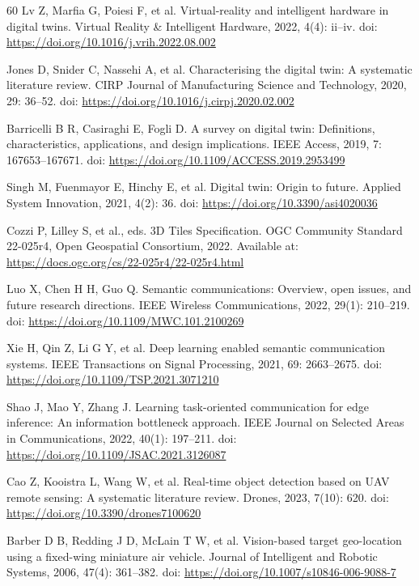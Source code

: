 \documentclass[fleqn]{VRIH2025}
\begin{document}
\begin{thebibliography}{60}
Lv Z, Marfia G, Poiesi F, et al. Virtual-reality and intelligent hardware in digital twins. Virtual Reality \& Intelligent Hardware, 2022, 4(4): ii--iv. doi: \url{https://doi.org/10.1016/j.vrih.2022.08.002}

Jones D, Snider C, Nassehi A, et al. Characterising the digital twin: A systematic literature review. CIRP Journal of Manufacturing Science and Technology, 2020, 29: 36--52. doi: \url{https://doi.org/10.1016/j.cirpj.2020.02.002}

Barricelli B R, Casiraghi E, Fogli D. A survey on digital twin: Definitions, characteristics, applications, and design implications. IEEE Access, 2019, 7: 167653--167671. doi: \url{https://doi.org/10.1109/ACCESS.2019.2953499}

Singh M, Fuenmayor E, Hinchy E, et al. Digital twin: Origin to future. Applied System Innovation, 2021, 4(2): 36. doi: \url{https://doi.org/10.3390/asi4020036}

Cozzi P, Lilley S, et al., eds. 3D Tiles Specification. OGC Community Standard 22-025r4, Open Geospatial Consortium, 2022. Available at: \url{https://docs.ogc.org/cs/22-025r4/22-025r4.html}

Luo X, Chen H H, Guo Q. Semantic communications: Overview, open issues, and future research directions. IEEE Wireless Communications, 2022, 29(1): 210--219. doi: \url{https://doi.org/10.1109/MWC.101.2100269}

Xie H, Qin Z, Li G Y, et al. Deep learning enabled semantic communication systems. IEEE Transactions on Signal Processing, 2021, 69: 2663--2675. doi: \url{https://doi.org/10.1109/TSP.2021.3071210}

Shao J, Mao Y, Zhang J. Learning task-oriented communication for edge inference: An information bottleneck approach. IEEE Journal on Selected Areas in Communications, 2022, 40(1): 197--211. doi: \url{https://doi.org/10.1109/JSAC.2021.3126087}

Cao Z, Kooistra L, Wang W, et al. Real-time object detection based on UAV remote sensing: A systematic literature review. Drones, 2023, 7(10): 620. doi: \url{https://doi.org/10.3390/drones7100620}

Barber D B, Redding J D, McLain T W, et al. Vision-based target geo-location using a fixed-wing miniature air vehicle. Journal of Intelligent and Robotic Systems, 2006, 47(4): 361--382. doi: \url{https://doi.org/10.1007/s10846-006-9088-7}


\end{thebibliography}
\end{document}
